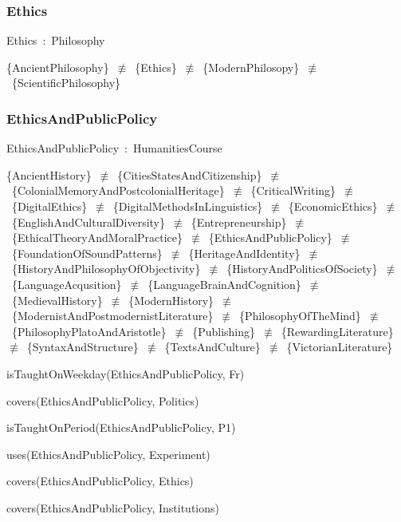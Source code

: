 \documentclass{article}
\begin{document}
\subsubsection*{Ethics}

Ethics~:~Philosophy

\{AncientPhilosophy\}~\ensuremath{\not\equiv}~\{Ethics\}~\ensuremath{\not\equiv}~\{ModernPhilosopy\}~\ensuremath{\not\equiv}~\{ScientificPhilosophy\}

\subsubsection*{EthicsAndPublicPolicy}

EthicsAndPublicPolicy~:~HumanitiesCourse

\{AncientHistory\}~\ensuremath{\not\equiv}~\{CitiesStatesAndCitizenship\}~\ensuremath{\not\equiv}~\{ColonialMemoryAndPostcolonialHeritage\}~\ensuremath{\not\equiv}~\{CriticalWriting\}~\ensuremath{\not\equiv}~\{DigitalEthics\}~\ensuremath{\not\equiv}~\{DigitalMethodsInLinguistics\}~\ensuremath{\not\equiv}~\{EconomicEthics\}~\ensuremath{\not\equiv}~\{EnglishAndCulturalDiversity\}~\ensuremath{\not\equiv}~\{Entrepreneurship\}~\ensuremath{\not\equiv}~\{EthicalTheoryAndMoralPractice\}~\ensuremath{\not\equiv}~\{EthicsAndPublicPolicy\}~\ensuremath{\not\equiv}~\{FoundationOfSoundPatterns\}~\ensuremath{\not\equiv}~\{HeritageAndIdentity\}~\ensuremath{\not\equiv}~\{HistoryAndPhilosophyOfObjectivity\}~\ensuremath{\not\equiv}~\{HistoryAndPoliticsOfSociety\}~\ensuremath{\not\equiv}~\{LanguageAcqusition\}~\ensuremath{\not\equiv}~\{LanguageBrainAndCognition\}~\ensuremath{\not\equiv}~\{MedievalHistory\}~\ensuremath{\not\equiv}~\{ModernHistory\}~\ensuremath{\not\equiv}~\{ModernistAndPostmodernistLiterature\}~\ensuremath{\not\equiv}~\{PhilosophyOfTheMind\}~\ensuremath{\not\equiv}~\{PhilosophyPlatoAndAristotle\}~\ensuremath{\not\equiv}~\{Publishing\}~\ensuremath{\not\equiv}~\{RewardingLiterature\}~\ensuremath{\not\equiv}~\{SyntaxAndStructure\}~\ensuremath{\not\equiv}~\{TextsAndCulture\}~\ensuremath{\not\equiv}~\{VictorianLiterature\}

isTaughtOnWeekday(EthicsAndPublicPolicy, Fr)

covers(EthicsAndPublicPolicy, Politics)

isTaughtOnPeriod(EthicsAndPublicPolicy, P1)

uses(EthicsAndPublicPolicy, Experiment)

covers(EthicsAndPublicPolicy, Ethics)

covers(EthicsAndPublicPolicy, Institutions)
\end{document}
